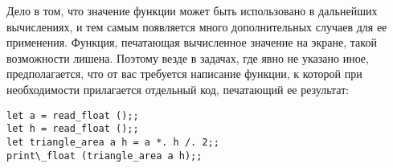 Дело в том, что значение функции может быть использовано в дальнейших 
вычислениях, и тем самым появляется много дополнительных случаев для 
ее применения. Функция, печатающая вычисленное значение на экране, такой 
возможности лишена. Поэтому везде в задачах, где явно не указано иное, 
предполагается, что от вас требуется написание функции, к которой при 
необходимости прилагается отдельный код, печатающий ее результат:

\begin{verbatim}
let a = read_float ();;
let h = read_float ();;
let triangle_area a h = a *. h /. 2;;
print\_float (triangle_area a h);;
\end{verbatim}

